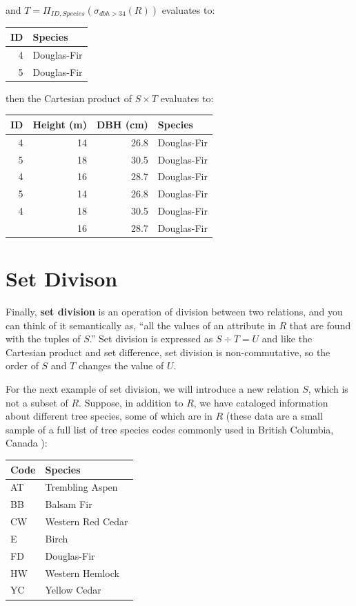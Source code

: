 \documentclass[
]{book}
\begin{document}
and \(T = Π_{ID,Species}(σ_{dbh>34}(R))\) evaluates to:

\begin{tabular}{rl}
\toprule
ID & Species\\
\midrule
4 & Douglas-Fir\\
5 & Douglas-Fir\\
\bottomrule
\end{tabular}

then the Cartesian product of \(S×T\) evaluates to:

\begin{tabular}{rrrl}
\toprule
ID & Height (m) & DBH (cm) & Species\\
\midrule
4 & 14 & 26.8 & Douglas-Fir\\
5 & 18 & 30.5 & Douglas-Fir\\
4 & 16 & 28.7 & Douglas-Fir\\
5 & 14 & 26.8 & Douglas-Fir\\
4 & 18 & 30.5 & Douglas-Fir\\
\addlinespace
5 & 16 & 28.7 & Douglas-Fir\\
\bottomrule
\end{tabular}

\section{Set Divison}\label{set-divison}

Finally, \textbf{set division} is an operation of division between two relations, and you can think of it semantically as, ``all the values of an attribute in \(R\) that are found with the tuples of \(S\).'' Set division is expressed as \(S÷T=U\) and like the Cartesian product and set difference, set division is non-commutative, so the order of \(S\) and \(T\) changes the value of \(U\).

For the next example of set division, we will introduce a new relation \(S\), which is not a subset of \(R\). Suppose, in addition to \(R\), we have cataloged information about different tree species, some of which are in \(R\) (these data are a small sample of a full list of tree species codes commonly used in British Columbia, Canada \citep{forest_practices_branch_silviculture_2005}):

\begin{tabular}{ll}
\toprule
Code & Species\\
\midrule
AT & Trembling Aspen\\
BB & Balsam Fir\\
CW & Western Red Cedar\\
E & Birch\\
FD & Douglas-Fir\\
\addlinespace
HW & Western Hemlock\\
YC & Yellow Cedar\\
\bottomrule
\end{tabular}
\end{document}
